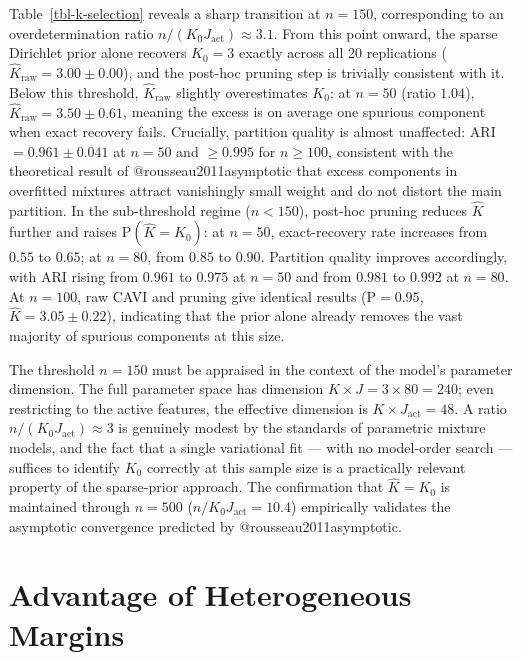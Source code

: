 \documentclass[
  letterpaper,
  DIV=11,
  numbers=noendperiod]{scrartcl}
\begin{document}
Table~\ref{tbl-k-selection} reveals a sharp transition at \(n = 150\),
corresponding to an overdetermination ratio
\(n / (K_0 J_{\text{act}}) \approx 3.1\). From this point onward, the
sparse Dirichlet prior alone recovers \(K_0 = 3\) exactly across all 20
replications (\(\widehat{K}_{\text{raw}} = 3.00
\pm 0.00\)), and the post-hoc pruning step is trivially consistent with
it. Below this threshold, \(\widehat{K}_{\text{raw}}\) slightly
overestimates \(K_0\): at \(n = 50\) (ratio \(1.04\)),
\(\widehat{K}_{\text{raw}} = 3.50 \pm 0.61\), meaning the excess is on
average one spurious component when exact recovery fails. Crucially,
partition quality is almost unaffected: ARI \(=
0.961 \pm 0.041\) at \(n = 50\) and \(\ge 0.995\) for \(n \ge 100\),
consistent with the theoretical result of @rousseau2011asymptotic that
excess components in overfitted mixtures attract vanishingly small
weight and do not distort the main partition. In the sub-threshold
regime (\(n < 150\)), post-hoc pruning reduces \(\widehat{K}\) further
and raises \(\mathrm{P}(\widehat{K} = K_0)\): at \(n = 50\),
exact-recovery rate increases from \(0.55\) to \(0.65\); at \(n = 80\),
from \(0.85\) to \(0.90\). Partition quality improves accordingly, with
ARI rising from \(0.961\) to \(0.975\) at \(n = 50\) and from \(0.981\)
to \(0.992\) at \(n = 80\). At \(n = 100\), raw CAVI and pruning give
identical results (\(\mathrm{P} = 0.95\),
\(\widehat{K} = 3.05 \pm 0.22\)), indicating that the prior alone
already removes the vast majority of spurious components at this size.

The threshold \(n = 150\) must be appraised in the context of the
model's parameter dimension. The full parameter space has dimension
\(K \times J = 3 \times 80 = 240\); even restricting to the active
features, the effective dimension is \(K \times J_{\text{act}} = 48\). A
ratio \(n / (K_0 J_{\text{act}}) \approx 3\) is genuinely modest by the
standards of parametric mixture models, and the fact that a single
variational fit --- with no model-order search --- suffices to identify
\(K_0\) correctly at this sample size is a practically relevant property
of the sparse-prior approach. The confirmation that
\(\widehat{K} = K_0\) is maintained through \(n =
500\) (\(n / K_0 J_{\text{act}} = 10.4\)) empirically validates the
asymptotic convergence predicted by @rousseau2011asymptotic.

\section{Advantage of Heterogeneous
Margins}\label{sec-margin-heterogeneity}
\end{document}
